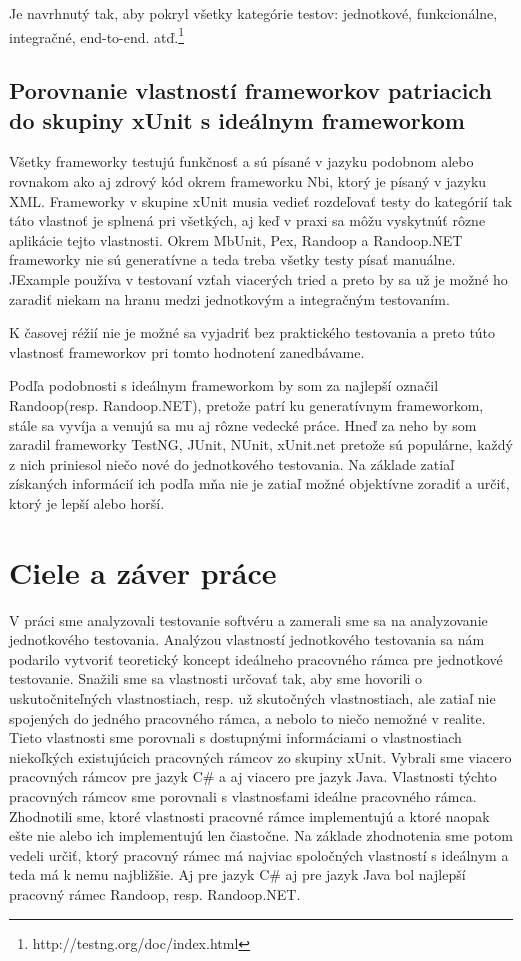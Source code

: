 \documentclass[11pt,twoside,slovak,a4paper]{article}
\begin{document}
		Je navrhnutý tak, aby pokryl všetky kategórie testov: jednotkové, funkcionálne, integračné, end-to-end. atď.\footnote{http://testng.org/doc/index.html}
		
	\subsection{Porovnanie vlastností frameworkov patriacich do skupiny xUnit s ideálnym frameworkom}
	
	Všetky frameworky testujú funkčnosť a sú písané v jazyku podobnom alebo rovnakom ako aj zdrový kód okrem frameworku Nbi, ktorý je písaný v jazyku XML. Frameworky v skupine xUnit musia vedieť rozdeľovať testy do kategórií tak táto vlastnoť je splnená pri všetkých, aj keď v praxi sa môžu vyskytnúť rôzne aplikácie tejto vlastnosti.
	Okrem MbUnit, Pex, Randoop a Randoop.NET frameworky nie sú generatívne a teda treba všetky testy písať manuálne.
	JExample používa v testovaní vzťah viacerých tried a preto by sa už je možné ho zaradiť niekam na hranu medzi jednotkovým a integračným testovaním.
	
	K časovej réžií nie je možné sa vyjadriť bez praktického testovania a preto túto vlastnosť frameworkov pri tomto hodnotení zanedbávame.
	
	Podľa podobnosti s ideálnym frameworkom by som za najlepší označil Randoop(resp. Randoop.NET), pretože patrí ku generatívnym frameworkom, stále sa vyvíja a venujú sa mu aj rôzne vedecké práce. Hneď za neho by som zaradil frameworky TestNG, JUnit, NUnit, xUnit.net pretože sú populárne, každý z nich priniesol niečo nové do jednotkového testovania. Na základe zatiaľ získaných informácií ich podľa mňa nie je zatiaľ možné objektívne zoradiť a určiť, ktorý je lepší alebo horší.
	
	\section{Ciele a záver práce}
	
	V práci sme analyzovali testovanie softvéru a zamerali sme sa na analyzovanie jednotkového testovania. Analýzou vlastností jednotkového testovania sa nám podarilo vytvoriť teoretický koncept ideálneho pracovného rámca pre jednotkové testovanie. Snažili sme sa vlastnosti určovať tak, aby sme hovorili o uskutočniteľných vlastnostiach, resp. už skutočných vlastnostiach, ale zatiaľ nie spojených do jedného pracovného rámca, a nebolo to niečo nemožné v realite. Tieto vlastnosti sme porovnali s dostupnými informáciami o vlastnostiach niekoľkých existujúcich pracovných rámcov zo skupiny xUnit. Vybrali sme viacero pracovných rámcov pre jazyk C\# a aj viacero pre jazyk Java. Vlastnosti týchto pracovných rámcov sme porovnali s vlastnosťami ideálne pracovného rámca. Zhodnotili sme, ktoré vlastnosti pracovné rámce implementujú a ktoré naopak ešte nie alebo ich implementujú len čiastočne. Na základe zhodnotenia sme potom vedeli určiť, ktorý pracovný rámec má najviac spoločných vlastností s ideálnym a teda má k nemu najbližšie. Aj pre jazyk C\# aj pre jazyk Java bol najlepší pracovný rámec Randoop, resp. Randoop.NET.
	
\end{document}
